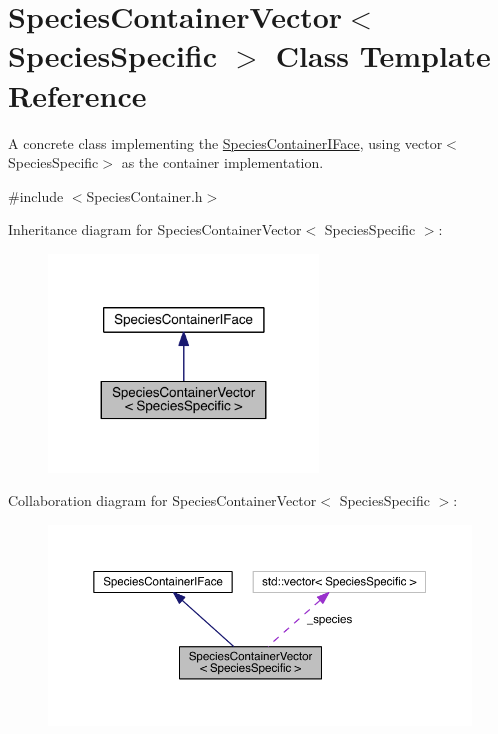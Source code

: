 \hypertarget{classSpeciesContainerVector}{\section{Species\+Container\+Vector$<$ Species\+Specific $>$ Class Template Reference}
\label{classSpeciesContainerVector}
}


A concrete class implementing the \hyperlink{classSpeciesContainerIFace}{Species\+Container\+I\+Face}, using vector$<$\+Species\+Specific$>$ as the container implementation.  




{\ttfamily \#include $<$Species\+Container.\+h$>$}



Inheritance diagram for Species\+Container\+Vector$<$ Species\+Specific $>$\+:\nopagebreak
\begin{figure}[H]
\begin{center}
\leavevmode
\includegraphics[width=203pt]{classSpeciesContainerVector__inherit__graph}
\end{center}
\end{figure}


Collaboration diagram for Species\+Container\+Vector$<$ Species\+Specific $>$\+:\nopagebreak
\begin{figure}[H]
\begin{center}
\leavevmode
\includegraphics[width=350pt]{classSpeciesContainerVector__coll__graph}
\end{center}
\end{figure}
